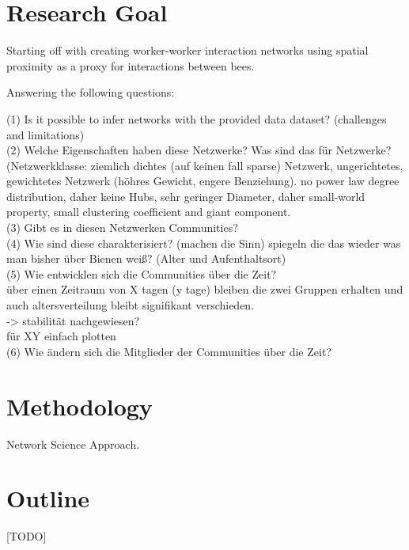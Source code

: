 \section{Research Goal}

Starting off with creating worker-worker interaction networks using spatial proximity as a proxy for interactions between bees.

Answering the following questions:

(1) Is it possible to infer networks with the provided data dataset? (challenges and limitations)\\

(2) Welche Eigenschaften haben diese Netzwerke? Was sind das für Netzwerke? (Netzwerkklasse: ziemlich dichtes (auf keinen fall sparse) Netzwerk, ungerichtetes, gewichtetes Netzwerk (höhres Gewicht, engere Benziehung). no power law degree distribution, daher keine Hubs, sehr geringer Diameter, daher small-world property, small clustering coefficient and giant component.\\

(3) Gibt es in diesen Netzwerken Communities?\\

(4) Wie sind diese charakterisiert? (machen die Sinn) spiegeln die das wieder was man bisher über Bienen weiß? (Alter und Aufenthaltsort)\\

(5) Wie entwicklen sich die Communities über die Zeit?\\
über einen Zeitraum von X tagen (y tage) bleiben die zwei Gruppen erhalten und auch altersverteilung bleibt signifikant verschieden.\\
-> stabilität nachgewiesen?\\
für XY einfach plotten\\

(6) Wie ändern sich die Mitglieder der Communities über die Zeit?\\


\section{Methodology}

Network Science Approach.

\section{Outline}
[TODO]